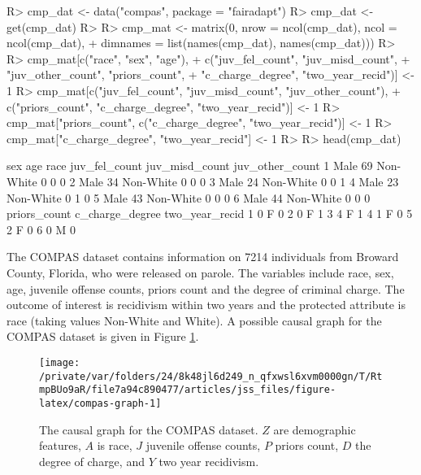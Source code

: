 \documentclass[
  nojss]{jss}
\begin{document}
\begin{CodeChunk}
\begin{CodeInput}
R> cmp_dat <- data("compas", package = "fairadapt")
R> cmp_dat <- get(cmp_dat)
R> 
R> cmp_mat <- matrix(0, nrow = ncol(cmp_dat), ncol = ncol(cmp_dat),
+                   dimnames = list(names(cmp_dat), names(cmp_dat)))
R> 
R> cmp_mat[c("race", "sex", "age"),
+         c("juv_fel_count", "juv_misd_count",
+           "juv_other_count", "priors_count",
+           "c_charge_degree", "two_year_recid")] <- 1
R> cmp_mat[c("juv_fel_count", "juv_misd_count", "juv_other_count"),
+         c("priors_count", "c_charge_degree", "two_year_recid")] <- 1
R> cmp_mat["priors_count", c("c_charge_degree", "two_year_recid")] <- 1
R> cmp_mat["c_charge_degree", "two_year_recid"] <- 1
R> 
R> head(cmp_dat)
\end{CodeInput}
\begin{CodeOutput}
   sex age      race juv_fel_count juv_misd_count juv_other_count
1 Male  69 Non-White             0              0               0
2 Male  34 Non-White             0              0               0
3 Male  24 Non-White             0              0               1
4 Male  23 Non-White             0              1               0
5 Male  43 Non-White             0              0               0
6 Male  44 Non-White             0              0               0
  priors_count c_charge_degree two_year_recid
1            0               F              0
2            0               F              1
3            4               F              1
4            1               F              0
5            2               F              0
6            0               M              0
\end{CodeOutput}
\end{CodeChunk}

The COMPAS dataset contains information on 7214 individuals from Broward
County, Florida, who were released on parole. The variables include
race, sex, age, juvenile offense counts, priors count and the degree of
criminal charge. The outcome of interest is recidivism within two years
and the protected attribute is race (taking values Non-White and White).
A possible causal graph for the COMPAS dataset is given in Figure
\ref{fig:compas-graph}.

\begin{CodeChunk}
\begin{figure}

{\centering \texttt{[image: /private/var/folders/24/8k48jl6d249\_n\_qfxwsl6xvm0000gn/T/RtmpBUo9aR/file7a94c890477/articles/jss\_files/figure-latex/compas-graph-1]} 

}

\caption[The causal graph for the COMPAS dataset]{The causal graph for the COMPAS dataset. $Z$ are demographic features, $A$ is race, $J$ juvenile offense counts, $P$ priors count, $D$ the degree of charge, and $Y$ two year recidivism.}\label{fig:compas-graph}
\end{figure}
\end{CodeChunk}
\end{document}
